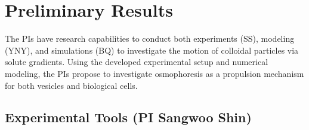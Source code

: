 \documentclass[11pt]{article}
\begin{document}
\section{Preliminary Results\label{sec:preliminary_results}} The PIs
have research capabilities to conduct both experiments (SS), modeling
(YNY), and simulations (BQ) to investigate the motion of colloidal
particles via solute gradients.  Using the developed experimental setup
and numerical modeling, the PIs propose to investigate osmophoresis as a
propulsion mechanism for both vesicles and biological cells. 

\subsection{Experimental Tools (PI Sangwoo Shin)}
\label{subsection:exp_tools}
\end{document}
